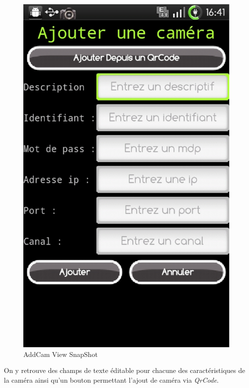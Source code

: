  \begin{center}
 \begin{figure}[H] 
  \label{addCamScreenShot}
  \centering
  \includegraphics[scale=0.3]{Images/addCamScreenShot.eps}
  \caption{AddCam View SnapShot}
\end{figure}  
\end{center}


On y retrouve des champs de texte éditable pour chacune
des caractéristiques de la caméra ainsi qu'un bouton permettant l'ajout de caméra via \textit{QrCode}.\newline



